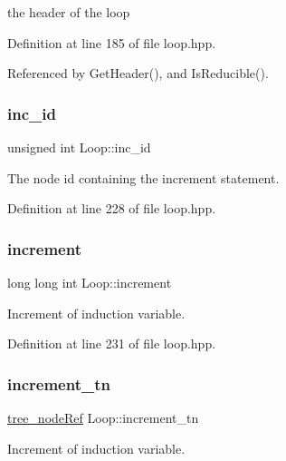 the header of the loop 



Definition at line 185 of file loop.\+hpp.



Referenced by Get\+Header(), and Is\+Reducible().

\mbox{\label{classLoop_a938693c5ccc84c12744e6da71135d695}} 
\subsubsection{\texorpdfstring{inc\+\_\+id}{inc\_id}}
{\footnotesize\ttfamily unsigned int Loop\+::inc\+\_\+id}



The node id containing the increment statement. 



Definition at line 228 of file loop.\+hpp.

\mbox{\label{classLoop_ab476fce933d31e27be927fde09e2b0d0}} 
\subsubsection{\texorpdfstring{increment}{increment}}
{\footnotesize\ttfamily long long int Loop\+::increment}



Increment of induction variable. 



Definition at line 231 of file loop.\+hpp.

\mbox{\label{classLoop_a45579348a2902d005b35360069b32f75}} 
\subsubsection{\texorpdfstring{increment\+\_\+tn}{increment\_tn}}
{\footnotesize\ttfamily \hyperlink{tree__node_8hpp_a6ee377554d1c4871ad66a337eaa67fd5}{tree\+\_\+node\+Ref} Loop\+::increment\+\_\+tn}



Increment of induction variable. 



